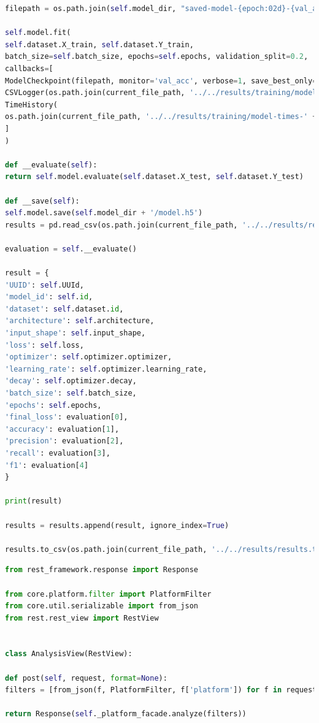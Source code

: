 \documentclass{article}
\begin{document}
\begin{lstlisting}[language=Python, caption=ml.core.model.model]
filepath = os.path.join(self.model_dir, "saved-model-{epoch:02d}-{val_accuracy:.2f}.hdf5")

self.model.fit(
self.dataset.X_train, self.dataset.Y_train,
batch_size=self.batch_size, epochs=self.epochs, validation_split=0.2,
callbacks=[
ModelCheckpoint(filepath, monitor='val_acc', verbose=1, save_best_only=False, mode='max'),
CSVLogger(os.path.join(current_file_path, '../../results/training/model-' + self.UUId + '.csv')),
TimeHistory(
os.path.join(current_file_path, '../../results/training/model-times-' + self.UUId + '.json'))
]
)

def __evaluate(self):
return self.model.evaluate(self.dataset.X_test, self.dataset.Y_test)

def __save(self):
self.model.save(self.model_dir + '/model.h5')
results = pd.read_csv(os.path.join(current_file_path, '../../results/results.tsv'), sep='\t', header=0)

evaluation = self.__evaluate()

result = {
'UUID': self.UUId,
'model_id': self.id,
'dataset': self.dataset.id,
'architecture': self.architecture,
'input_shape': self.input_shape,
'loss': self.loss,
'optimizer': self.optimizer.optimizer,
'learning_rate': self.optimizer.learning_rate,
'decay': self.optimizer.decay,
'batch_size': self.batch_size,
'epochs': self.epochs,
'final_loss': evaluation[0],
'accuracy': evaluation[1],
'precision': evaluation[2],
'recall': evaluation[3],
'f1': evaluation[4]
}

print(result)

results = results.append(result, ignore_index=True)

results.to_csv(os.path.join(current_file_path, '../../results/results.tsv'), sep='\t', index=False)
\end{lstlisting}

\begin{lstlisting}[language=Python, caption=web.analysis\_api.analysis\_view]
from rest_framework.response import Response

from core.platform.filter import PlatformFilter
from core.util.serializable import from_json
from rest.rest_view import RestView


class AnalysisView(RestView):

def post(self, request, format=None):
filters = [from_json(f, PlatformFilter, f['platform']) for f in request.data]

return Response(self._platform_facade.analyze(filters))
\end{lstlisting}
\end{document}
